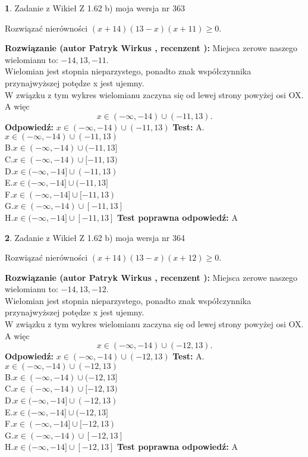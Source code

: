 \documentclass[12pt, a4paper]{article}
\theoremstyle{definition} %
\newtheorem{zad}{}
\newcommand{\zadStart}[1]{\begin{zad}#1\newline}
\newcommand{\zadStop}{\end{zad}}
\newcommand{\rozwStart}[2]{\noindent \textbf{Rozwiązanie (autor #1 , recenzent #2): }\newline}
\newcommand{\rozwStop}{\newline}
\newcommand{\odpStart}{\noindent \textbf{Odpowiedź:}\newline}
\newcommand{\odpStop}{\newline}
\newcommand{\testStart}{\noindent \textbf{Test:}\newline}
\newcommand{\testStop}{\newline}
\newcommand{\kluczStart}{\noindent \textbf{Test poprawna odpowiedź:}\newline}
\newcommand{\kluczStop}{\newline}
\begin{document}
\zadStart{Zadanie z Wikieł Z 1.62 b) moja wersja nr 363}

Rozwiązać nierówności $(x+14)(13-x)(x+11)\ge0$.
\zadStop
\rozwStart{Patryk Wirkus}{}
Miejsca zerowe naszego wielomianu to: $-14, 13, -11$.\\
Wielomian jest stopnia nieparzystego, ponadto znak współczynnika przy\linebreak najwyższej potędze x jest ujemny.\\ W związku z tym wykres wielomianu zaczyna się od lewej strony powyżej osi OX. A więc $$x \in (-\infty,-14) \cup (-11,13).$$
\rozwStop
\odpStart
$x \in (-\infty,-14) \cup (-11,13)$
\odpStop
\testStart
A.$x \in (-\infty,-14) \cup (-11,13)$\\
B.$x \in (-\infty,-14) \cup (-11,13]$\\
C.$x \in (-\infty,-14) \cup [-11,13)$\\
D.$x \in (-\infty,-14] \cup (-11,13)$\\
E.$x \in (-\infty,-14] \cup (-11,13]$\\
F.$x \in (-\infty,-14] \cup [-11,13)$\\
G.$x \in (-\infty,-14) \cup [-11,13]$\\
H.$x \in (-\infty,-14] \cup [-11,13]$
\testStop
\kluczStart
A
\kluczStop



\zadStart{Zadanie z Wikieł Z 1.62 b) moja wersja nr 364}

Rozwiązać nierówności $(x+14)(13-x)(x+12)\ge0$.
\zadStop
\rozwStart{Patryk Wirkus}{}
Miejsca zerowe naszego wielomianu to: $-14, 13, -12$.\\
Wielomian jest stopnia nieparzystego, ponadto znak współczynnika przy\linebreak najwyższej potędze x jest ujemny.\\ W związku z tym wykres wielomianu zaczyna się od lewej strony powyżej osi OX. A więc $$x \in (-\infty,-14) \cup (-12,13).$$
\rozwStop
\odpStart
$x \in (-\infty,-14) \cup (-12,13)$
\odpStop
\testStart
A.$x \in (-\infty,-14) \cup (-12,13)$\\
B.$x \in (-\infty,-14) \cup (-12,13]$\\
C.$x \in (-\infty,-14) \cup [-12,13)$\\
D.$x \in (-\infty,-14] \cup (-12,13)$\\
E.$x \in (-\infty,-14] \cup (-12,13]$\\
F.$x \in (-\infty,-14] \cup [-12,13)$\\
G.$x \in (-\infty,-14) \cup [-12,13]$\\
H.$x \in (-\infty,-14] \cup [-12,13]$
\testStop
\kluczStart
A
\kluczStop
\end{document}
